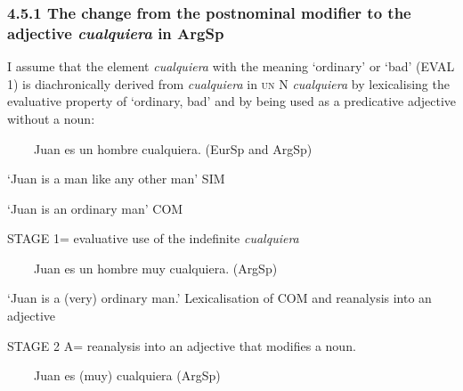 \subsubsection[4.5.1 The change from the postnominal modifier to the adjective cualquiera in ArgSp]{\textbf{4.5.1 The change from the postnominal modifier to the adjective }\textbf{\textit{cualquiera}}\textbf{ in }\textbf{ArgSp}}
\begin{styleStandard}
I assume that the element \textit{cualquiera} with the meaning ‘ordinary’ or ‘bad’ (EVAL 1) is diachronically derived from \textit{cualquiera} in \textsc{un} N \textit{cualquiera} by lexicalising the evaluative property of ‘ordinary, bad’ and by being used as a predicative adjective without a noun:
\end{styleStandard}

\begin{styleStandard}
\textbf{\ \ }\ \ Juan es un hombre cualquiera. (EurSp and ArgSp)
\end{styleStandard}

\begin{styleStandard}
‘Juan is a man like any other man’ SIM
\end{styleStandard}

\begin{styleStandard}
‘Juan is an ordinary man’ COM
\end{styleStandard}

\begin{styleStandard}
STAGE 1= evaluative use of the indefinite \textit{cualquiera} 
\end{styleStandard}

\begin{styleStandard}
\textbf{\ \ }\ \ Juan es un hombre muy cualquiera. (ArgSp)
\end{styleStandard}

\begin{styleStandard}
‘Juan is a (very) ordinary man.’ Lexicalisation of COM and reanalysis into an adjective
\end{styleStandard}

\begin{styleStandard}
STAGE 2 A= reanalysis into an adjective that modifies a noun.
\end{styleStandard}

\begin{styleStandard}
\textbf{\ \ }\ \ Juan es (muy) cualquiera (ArgSp) 
\end{styleStandard}

